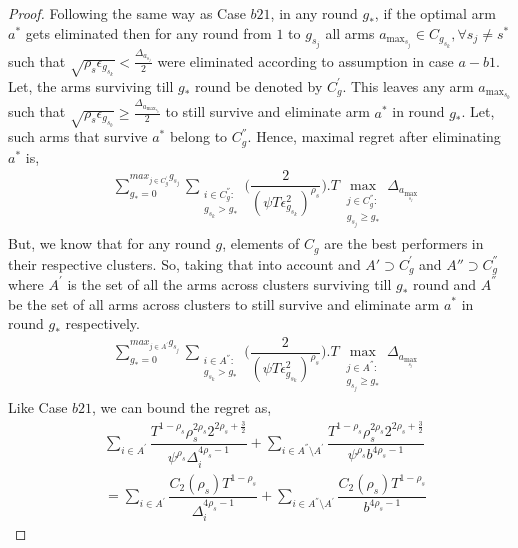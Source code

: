 \begin{proof}
Following the same way as Case $b21$, in any round $g_{*}$, if the optimal arm $a^{*}$ gets eliminated then for any round from $1$ to $g_{s_{j}}$ all arms $a_{\max_{s_{j}}}\in C_{g_{s_{k}}},\forall s_{j}\neq s^{*}$ such that $\sqrt{\rho_{s}\epsilon_{g_{s_{k}}}}<\frac{\Delta_{a_{s_{j}}}}{2}$ were eliminated according to assumption in case $a-b1$. Let, the arms surviving till $g_{*}$ round be denoted by $C_{g}^{'}$. This leaves any arm $a_{\max_{s_{b}}}$ such that $\sqrt{\rho_{s}\epsilon_{g_{s_{b}}}}\geq\frac{\Delta_{a_{\max_{s_{b}}}}}{2}$ to still survive and eliminate arm $a^{*}$ in round $g_{*}$. Let, such arms that survive $a^{*}$ belong to $C_{g}^{''}$. Hence, maximal regret after eliminating $a^{*}$ is,
 \begin{align*}
 &\sum_{g_{*}=0}^{max_{j\in C_{g}^{'}}g_{s_{j}}}\sum_{\substack{i\in C_{g}^{''}: \\ g_{s_{k}}>g_{*}}}\bigg(\dfrac{2}{(\psi T\epsilon_{g_{s_{k}}}^{2})^{\rho_{s}}} \bigg).T\max_{\substack{j\in C_{g}^{''}: \\ g_{s_{j}}\geq g_{*}}}{\Delta}_{a_{\max_{s_{j}}}}
 \end{align*}
But, we know that for any round $g$, elements of $C_{g}$ are the best performers in their respective clusters. So, taking that into account and $A'\supset C_{g}^{'}$ and $A''\supset C_{g}^{''}$ where $A^{'}$ is the set of all the arms across clusters surviving till $g_{*}$ round and $A^{''}$ be the set of all arms across clusters to still survive and eliminate arm $a^{*}$ in round $g_{*}$ respectively.
\begin{align*}
 & \sum_{g_{*}=0}^{max_{j\in A^{'}}g_{s_{j}}}\sum_{\substack{i\in A^{''}: \\ g_{s_{k}}>g_{*}}}\bigg(\dfrac{2}{(\psi T\epsilon_{g_{s_{k}}}^{2})^{\rho_{s}}} \bigg).T\max_{\substack{j\in A^{''}: \\ g_{s_{j}}\geq g_{*}}}{\Delta}_{a_{\max_{s_{j}}}}
\end{align*}
Like Case $b21$, we can bound the regret as,
\begin{align*}
 &\sum_{i\in A^{'}}\dfrac{T^{1-\rho_{s}}\rho_{s}^{2\rho_{s}}2^{2\rho_{s}+\frac{3}{2}}}{\psi^{\rho_{s}}\Delta_{i}^{4\rho_{s}-1}} +\sum_{i\in A^{''}\setminus A^{'}}\dfrac{T^{1-\rho_{s}}\rho_{s}^{2\rho_{s}}2^{2\rho_{s}+\frac{3}{2}}}{\psi^{\rho_{s}}b^{4\rho_{s}-1}} \\
 & = \sum_{i\in A^{'}}\dfrac{C_{2}(\rho_{s})T^{1-\rho_{s}}}{\Delta_{i}^{4\rho_{s}-1}} +\sum_{i\in A^{''}\setminus A^{'}}\dfrac{C_{2}(\rho_{s})T^{1-\rho_{s}}}{b^{4\rho_{s}-1}} 
\end{align*}


\end{proof}
